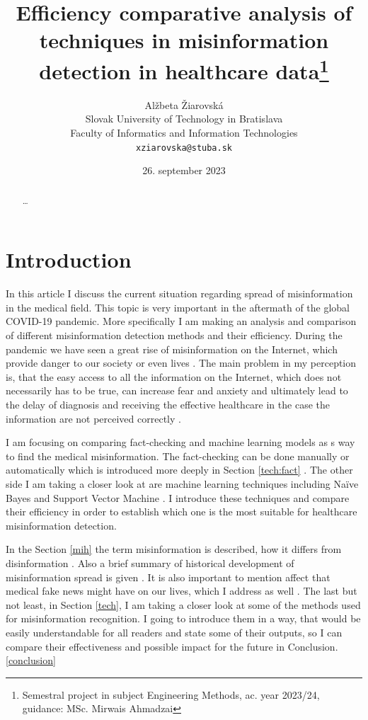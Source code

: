 \documentclass[11pt ,english,a4paper]{article}
\title{Efficiency comparative analysis of techniques in misinformation detection in healthcare data\thanks{Semestral project in subject Engineering Methods, ac. year 2023/24, guidance: MSc. Mirwais Ahmadzai}}
\author{Alžbeta Žiarovská\\[2pt]
	{\small Slovak University of Technology in Bratislava}\\
	{\small Faculty of Informatics and Information Technologies}\\
	{\small \texttt{xziarovska@stuba.sk}}
	}
\date{\small 26. september 2023}
\begin{document}
\maketitle
\newpage

\begin{abstract}
\ldots
\end{abstract}
\newpage

\section{Introduction}\label{intro}

In this article I discuss the current situation regarding spread of misinformation in the medical field. This topic is very important in the aftermath of the global COVID-19 pandemic. More specifically I am making an analysis and comparison of different misinformation detection methods and their efficiency. During the pandemic we have seen a great rise of misinformation on the Internet, which provide danger to our society or even lives \cite{war18dr}. The main problem in my perception is, that the easy access to all the information on the Internet, which does not necessarily has to be true, can increase fear and anxiety and ultimately lead to the delay of diagnosis and receiving the effective healthcare in the case the information are not perceived correctly \cite{wa19sys}. 

I am focusing on comparing fact-checking and machine learning models as s way to find the medical misinformation. The fact-checking can be done manually or automatically which is introduced more deeply in Section \ref{tech:fact} \cite{bar21health}. The other side I am taking a closer look at are machine learning techniques including Naïve Bayes and Support Vector Machine \cite{bar21health}. I introduce these techniques and compare their efficiency in order to establish which one is the most suitable for healthcare misinformation detection.

In the Section \ref{mih} the term misinformation is described, how it differs from disinformation \cite{gu20misinfo}. Also a brief summary of historical development of misinformation spread is given \cite{pos18short}. It is also important to mention affect that medical fake news might have on our lives, which I address as well \cite{who22infodemics}. The last but not least, in Section \ref{tech}, I am taking a closer look at some of the methods used for misinformation recognition. I going to introduce them in a way, that would be easily understandable for all readers and state some of their outputs, so I can compare their effectiveness and possible impact for the future in Conclusion. \ref{conclusion}
\end{document}
